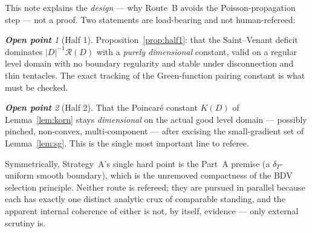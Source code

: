 \documentclass[11pt]{amsart}
\theoremstyle{definition}
\theoremstyle{remark}
\newtheorem*{checkpoint}{\textbf{Open point}}
\newcommand{\dT}{\delta_T}
\newcommand{\R}{\mathcal R}
\begin{document}
This note explains the \emph{design} --- why Route~B avoids the
Poisson-propagation step --- not a proof. Two statements are
load-bearing and not human-refereed:
\begin{checkpoint}[Half 1]
Proposition~\ref{prop:half1}: that the Saint--Venant deficit dominates
$|D|^{-1}\R(D)$ with a \emph{purely dimensional} constant, valid on a
regular level domain with no boundary regularity and stable under
disconnection and thin tentacles. The exact tracking of the
Green-function pairing constant is what must be checked.
\end{checkpoint}
\begin{checkpoint}[Half 2]
That the Poincar\'e constant $K(D)$ of Lemma~\ref{lem:korn} stays
\emph{dimensional} on the actual good level domain --- possibly
pinched, non-convex, multi-component --- after excising the
small-gradient set of Lemma~\ref{lem:sg}. This is the single most
important line to referee.
\end{checkpoint}
Symmetrically, Strategy~A's single hard point is the Part~A premise
(a $\dT$-uniform smooth boundary), which is the unremoved compactness
of the BDV selection principle. Neither route is refereed; they are
pursued in parallel because each has exactly one distinct analytic
crux of comparable standing, and the apparent internal coherence of
either is not, by itself, evidence --- only external scrutiny is.
\end{document}
